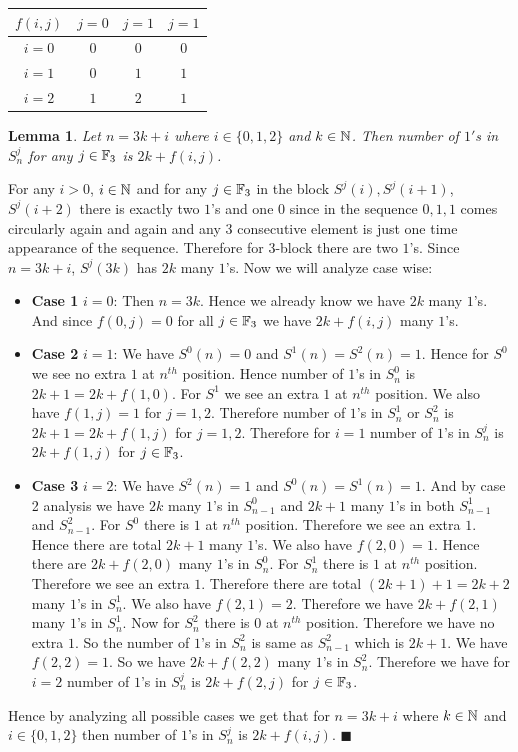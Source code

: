 \documentclass[a4paper, 11pt]{article}
\newtheorem{lemma}{Lemma}
\renewenvironment{proof}{\noindent{\it \textbf{Proof:}}\hspace*{1em}}{\hfill $\blacksquare$\bigskip\\}
\begin{document}
{\begin{center}
	\begin{tabular}{|c|c|c|c|}
		\hline
		$f(i,j)$ & $j=0$ & $j=1$ & $j=1$ \\\hline
		 $i=0$   &  $0$  &  $0$  &  $0$  \\\hline
		 $i=1$   &  $0$  &  $1$  &  $1$  \\\hline
		 $i=2$   &  $1$  &  $2$  &  $1$\\\hline
	\end{tabular}
\end{center}
\begin{lemma}\label{p3lm3}
	Let $n=3k+i$ where $i\in\{0,1,2\}$ and $k\in\mathbb{N}$. Then number of $1'$s in $S_n^j$ for any $j\in \mathbb{F}_3$ is $2k+f(i,j)$.
\end{lemma}
\begin{proof}
	For any $i>0$, $i\in\mathbb{N}$ and for any $j\in\mathbb{F}_3$ in the block $S^j(i), S^j(i+1)$, $S^j(i+2)$ there is exactly two $1$'s and one $0$ since in the sequence $0,1,1$ comes circularly again and again and any 3 consecutive element is just one time appearance of the sequence. Therefore for 3-block there are two $1$'s. Since $n=3k+i$, $S^j(3k)$ has $2k$ many $1$'s. Now we will analyze case wise:\begin{itemize}
		\item \textbf{Case 1} $i=0$: Then $n=3k$. Hence we already know we have $2k$ many $1$'s. And since $f(0,j)=0$ for all $j\in\mathbb{F}_3$ we have $2k+f(i,j)$ many $1$'s.
		\item \textbf{Case 2} $i=1$: We have $S^0(n)=0$ and $S^1(n)=S^2(n)=1$. Hence for $S^0$ we see no extra $1$ at $n^{th}$ position. Hence number of $1$'s in $S^0_n$ is $2k+1 =2k+f(1,0)$. For $S^1$ we see an extra $1$ at $n^{th}$ position. We also have $f(1,j)=1$ for $j=1,2$. Therefore number of $1$'s in $S^1_n$ or $S^2_n$ is $2k+1=2k+f(1,j)$ for $j=1,2$. Therefore for $i=1$ number of $1$'s in $S_n^j$ is $2k+f(1,j)$ for $j\in\mathbb{F}_3$.
		\item \textbf{Case 3} $i=2$: We have $S^2(n)=1$ and $S^0(n)=S^1(n)=1$. And by case 2 analysis we have $2k$ many $1$'s in $S_{n-1}^0$ and $2k+1$ many $1$'s in both $S_{n-1}^1$ and $S_{n-1}^2$. For $S^0$ there is  $1$ at $n^{th}$ position. Therefore we see an extra  $1$. Hence there are total $2k+1$ many $1$'s. We also have $f(2,0)=1$. Hence there are $2k+f(2,0)$ many $1$'s in $S_n^0$. For $S_n^1$ there is $1$ at $n^{th}$ position. Therefore we see an extra $1$. Therefore there are total $(2k+1)+1=2k+2$ many $1$'s in $S_n^1$. We also have $f(2,1)=2$. Therefore we have $2k+f(2,1)$ many $1$'s in $S_n^1$. Now for $S_n^2$ there is $0$ at $n^{th}$ position. Therefore we have no extra $1$. So the number of $1$'s in $S_n^2$ is same as $S_{n-1}^2$ which is $2k+1$. We have $f(2,2)=1$. So we have $2k+f(2,2)$ many $1$'s in $S_n^2$. Therefore we have for $i=2$ number of $1$'s in $S_n^j$ is $2k+f(2,j)$ for $j\in\mathbb{F}_3$. 
	\end{itemize}
Hence by analyzing all possible cases we get that for $n=3k+i$ where $k\in\mathbb{N}$ and $i\in\{0,1,2\}$ then number of $1$'s in $S_n^j$ is $2k+f(i,j)$.
\end{proof}

}
\end{document}
